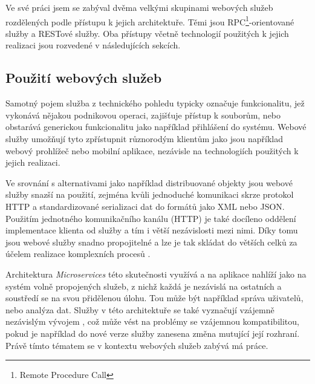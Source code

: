 \documentclass[czech,DP]{thesiskiv}
\begin{document}
Ve své práci jsem se zabýval dvěma velkými skupinami webových služeb rozdělených podle přístupu k jejich architektuře. Těmi jsou RPC\footnote{Remote Procedure Call}-orientované služby a RESTové služby. Oba přístupy včetně technologií použitých k jejich realizaci jsou rozvedené v následujících sekcích.

\subsection{Použití webových služeb}

Samotný pojem služba z technického pohledu typicky označuje funkcionalitu, jež vykonává nějakou podnikovou operaci, zajišťuje přístup k souborům, nebo obstarává generickou funkcionalitu jako například přihlášení do systému. Webové služby umožňují tyto zpřístupnit různorodým klientům jako jsou například webový prohlížeč nebo mobilní aplikace, nezávisle na technologiích použitých k jejich realizaci.

Ve srovnání s alternativami jako například distribuované objekty jsou webové služby snazší na použití, zejména kvůli jednoduché komunikaci skrze protokol HTTP a standardizované serializaci dat do formátů jako XML nebo JSON. Použitím jednotného komunikačního kanálu (HTTP) je také docíleno oddělení implementace klienta od služby a tím i větší nezávislosti mezi nimi. Díky tomu jsou webové služby snadno propojitelné a lze je tak skládat do větších celků za účelem realizace komplexních procesů \cite{fromObjectsToWs}.

Architektura \textit{Microservices} této skutečnosti využívá a na aplikace nahlíží jako na systém volně propojených služeb, z nichž každá je nezávislá na ostatních a soustředí se na svou přidělenou úlohu. Tou může být například správa uživatelů, nebo analýza dat. Služby v této architektuře se také vyznačují vzájemně nezávislým vývojem \cite{microservices}, což může vést na problémy se vzájemnou kompatibilitou, pokud je například do nové verze služby zanesena změna mutující její rozhraní. Právě tímto tématem se v kontextu webových služeb zabývá má práce.
\end{document}
